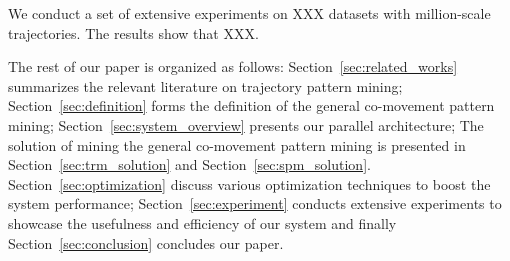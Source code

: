 We conduct a set of extensive experiments on XXX datasets with million-scale trajectories. The results show that XXX.

The rest of our paper is organized as follows: Section~\ref{sec:related_works} summarizes the relevant literature on 
trajectory pattern mining; Section~\ref{sec:definition} forms the definition of the general co-movement pattern mining; Section~\ref{sec:system_overview} presents our parallel architecture; The solution of mining the general co-movement pattern mining is presented in Section~\ref{sec:trm_solution} and Section~\ref{sec:spm_solution}. Section~\ref{sec:optimization} discuss various optimization techniques to boost the system performance; Section~\ref{sec:experiment} conducts extensive experiments to showcase the usefulness and efficiency of our system and finally Section~\ref{sec:conclusion} concludes our paper.
